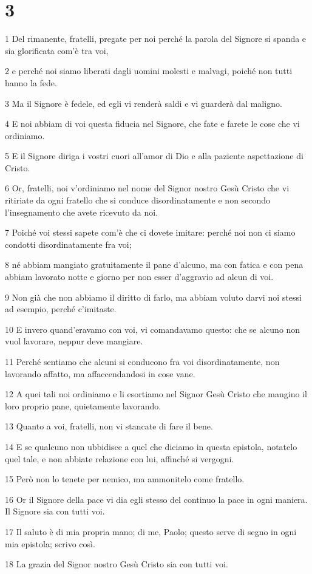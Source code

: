 \chapter{3}

\par 1 Del rimanente, fratelli, pregate per noi perché la parola del Signore si spanda e sia glorificata com'è tra voi,
\par 2 e perché noi siamo liberati dagli uomini molesti e malvagi, poiché non tutti hanno la fede.
\par 3 Ma il Signore è fedele, ed egli vi renderà saldi e vi guarderà dal maligno.
\par 4 E noi abbiam di voi questa fiducia nel Signore, che fate e farete le cose che vi ordiniamo.
\par 5 E il Signore diriga i vostri cuori all'amor di Dio e alla paziente aspettazione di Cristo.
\par 6 Or, fratelli, noi v'ordiniamo nel nome del Signor nostro Gesù Cristo che vi ritiriate da ogni fratello che si conduce disordinatamente e non secondo l'insegnamento che avete ricevuto da noi.
\par 7 Poiché voi stessi sapete com'è che ci dovete imitare: perché noi non ci siamo condotti disordinatamente fra voi;
\par 8 né abbiam mangiato gratuitamente il pane d'alcuno, ma con fatica e con pena abbiam lavorato notte e giorno per non esser d'aggravio ad alcun di voi.
\par 9 Non già che non abbiamo il diritto di farlo, ma abbiam voluto darvi noi stessi ad esempio, perché c'imitaste.
\par 10 E invero quand'eravamo con voi, vi comandavamo questo: che se alcuno non vuol lavorare, neppur deve mangiare.
\par 11 Perché sentiamo che alcuni si conducono fra voi disordinatamente, non lavorando affatto, ma affaccendandosi in cose vane.
\par 12 A quei tali noi ordiniamo e li esortiamo nel Signor Gesù Cristo che mangino il loro proprio pane, quietamente lavorando.
\par 13 Quanto a voi, fratelli, non vi stancate di fare il bene.
\par 14 E se qualcuno non ubbidisce a quel che diciamo in questa epistola, notatelo quel tale, e non abbiate relazione con lui, affinché si vergogni.
\par 15 Però non lo tenete per nemico, ma ammonitelo come fratello.
\par 16 Or il Signore della pace vi dia egli stesso del continuo la pace in ogni maniera. Il Signore sia con tutti voi.
\par 17 Il saluto è di mia propria mano; di me, Paolo; questo serve di segno in ogni mia epistola; scrivo così.
\par 18 La grazia del Signor nostro Gesù Cristo sia con tutti voi.


